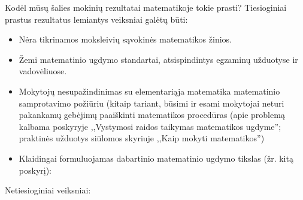 \documentclass{article}
\begin{document}
Kodėl mūsų šalies mokinių rezultatai matematikoje tokie prasti? Tiesioginiai prastus rezultatus lemiantys veiksniai galėtų būti:
\begin{itemize}
\item Nėra tikrinamos moksleivių sąvokinės matematikos žinios.
\item Žemi matematinio ugdymo standartai, atsispindintys egzaminų užduotyse ir vadovėliuose.
\item Mokytojų nesupažindinimas su elementariąja matematika matematinio samprotavimo požiūriu (kitaip tariant, būsimi ir esami mokytojai neturi pakankamų gebėjimų paaiškinti matematikos procedūras (apie problemą kalbama poskyryje ,,Vystymosi raidos taikymas matematikos ugdyme''; praktinės užduotys siūlomos skyriuje ,,Kaip mokyti matematikos'')
\item Klaidingai formuluojamas dabartinio matematinio ugdymo tikslas (žr. kitą poskyrį): 
\end{itemize}
Netiesioginiai veiksniai:
\end{document}
